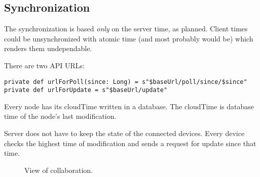 \subsection{Synchronization}
\label{subsection:akka-synchro}
The synchronization is based \emph{only} on the server time, as planned. Client times could be unsynchronized with atomic time (and most probably would be) which renders them undependable.

There are two API URLs:

\begin{verbatim}
private def urlForPoll(since: Long) = s"$baseUrl/poll/since/$since"
private def urlForUpdate = s"$baseUrl/update"
\end{verbatim}

Every node has its cloudTime written in a database. The cloudTime is database time of the node's last modification.

Server does not have to keep the state of the connected devices. Every device checks the highest time of modification and sends a request for update since that time.


\begin{figure}[h]
	\centering
	\caption{View of collaboration.}
	\label{fig:screen-collaboration}
\end{figure}
